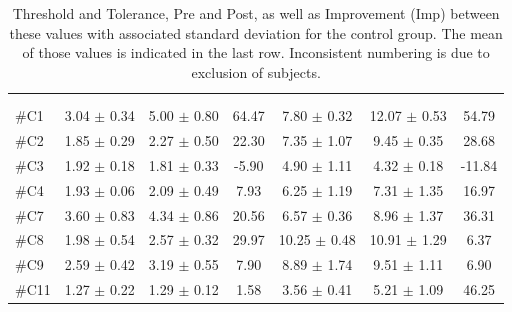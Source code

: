 \begin{longtable} {l|c|c|c|c|c|c}
\caption{Threshold and Tolerance, Pre and Post, as well as Improvement (Imp) between these values with associated standard deviation for the control group. The mean of those values is indicated in the last row. Inconsistent numbering is due to exclusion of subjects.}
	\label{tab:Control} \\
\cellcolor[HTML]{C0C0C0} {} & 
\multicolumn{3}{c|}{ \cellcolor[HTML]{C0C0C0}{\textbf{Threshold}}} & \multicolumn{3}{c}{ \cellcolor[HTML]{C0C0C0}{\textbf{Tolerance}}}  	\\  \rule{0pt}{3ex} 
  \cellcolor[HTML]{C0C0C0}{} &
 \multicolumn{1}{c|}{ \cellcolor[HTML]{C0C0C0}{Pre [kgF]}} & \multicolumn{1}{c|}{ \cellcolor[HTML]{C0C0C0}{Post [kgF]}} & \multicolumn{1}{c|}{ \cellcolor[HTML]{C0C0C0}{Imp [\%]}} 
 & \multicolumn{1}{|c|}{ \cellcolor[HTML]{C0C0C0}{Pre [kgF]}} 
 & \multicolumn{1}{c|}{ \cellcolor[HTML]{C0C0C0}{Post [kgF]}} & \multicolumn{1}{c}{ \cellcolor[HTML]{C0C0C0}{Imp[\%]}} \\ \hline  
\#C1 & 3.04 $\pm$ 0.34	& 5.00 $\pm$ 0.80 & 64.47	& 7.80 $\pm$	 0.32 & 12.07 $\pm$ 0.53 & 54.79 \\ \hline
\#C2 & 1.85 $\pm$ 0.29 	& 2.27 $\pm$ 0.50 & 22.30	& 7.35 $\pm$ 1.07	& 9.45 $\pm$ 0.35 & 28.68	\\ \hline
\#C3 & 1.92 $\pm$ 0.18 & 1.81 $\pm$ 0.33 &-5.90 & 4.90 $\pm$ 1.11 	& 	4.32 $\pm$ 0.18 & -11.84	\\ \hline
\#C4 & 1.93 $\pm$ 0.06 & 2.09 $\pm$ 0.49 & 7.93	& 6.25 $\pm$ 1.19	&7.31 $\pm$ 	1.35  & 16.97 \\ \hline
\#C7 & 3.60 $\pm$ 0.83  & 4.34 $\pm$	0.86 & 20.56	& 6.57 $\pm$ 0.36 & 8.96 $\pm$ 1.37 & 36.31 \\ \hline
\#C8 & 1.98 $\pm$ 0.54 & 2.57 $\pm$ 0.32 & 29.97	& 10.25 $\pm$ 0.48	& 10.91 $\pm$  1.29 & 6.37 \\ \hline
\#C9 & 2.59 $\pm$ 0.42 & 3.19 $\pm$ 0.55 & 7.90 & 8.89 $\pm$ 1.74	& 9.51 $\pm$  1.11 & 6.90 \\ \hline
\#C11 & 1.27 $\pm$ 0.22 & 1.29 	$\pm$ 0.12 & 1.58 	& 3.56 $\pm$ 0.41 & 5.21 $\pm$ 1.09 & 46.25 \\ \hline

\end{longtable}
